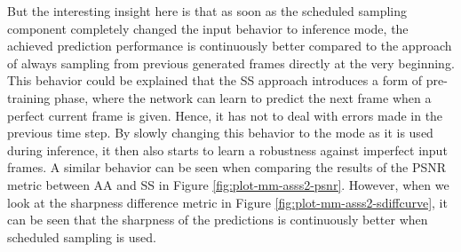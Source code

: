 But the interesting insight here is that as soon as the scheduled sampling component completely changed the input behavior to inference mode, the achieved prediction performance is continuously better compared to the approach of always sampling from previous generated frames directly at the very beginning. This behavior could be explained that the SS approach introduces a form of pre-training phase, where the network can learn to predict the next frame when a perfect current frame is given. Hence, it has not to deal with errors made in the previous time step. By slowly changing this behavior to the mode as it is used during inference, it then also starts to learn a robustness against imperfect input frames. A similar behavior can be seen when comparing the results of the PSNR metric between AA and SS in Figure \ref{fig:plot-mm-asss2-psnr}. However, when we look at the sharpness difference metric in Figure \ref{fig:plot-mm-asss2-sdiffcurve}, it can be seen that the sharpness of the predictions is continuously better when scheduled sampling is used.

